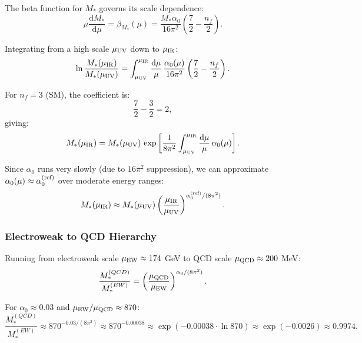 \documentclass[11pt,a4paper]{article}
\numberwithin{equation}{section}
\theoremstyle{plain}
\theoremstyle{definition}
\theoremstyle{remark}
\newcommand{\dd}{\mathrm{d}}
\begin{document}
The beta function for $M_*$ governs its scale dependence:
\begin{equation}
\mu\frac{\dd M_*}{\dd\mu} = \beta_{M_*}(\mu) = \frac{M_*\alpha_0}{16\pi^2}\left(\frac{7}{2} - \frac{n_f}{2}\right).
\label{eq:beta-M-hierarchy}
\end{equation}

Integrating from a high scale $\mu_{\rm UV}$ down to $\mu_{\rm IR}$:
\begin{equation}
\ln\frac{M_*(\mu_{\rm IR})}{M_*(\mu_{\rm UV})} = \int_{\mu_{\rm UV}}^{\mu_{\rm IR}} \frac{\dd\mu}{\mu}\,\frac{\alpha_0(\mu)}{16\pi^2}\left(\frac{7}{2} - \frac{n_f}{2}\right).
\label{eq:M-running-integral}
\end{equation}

For $n_f=3$ (SM), the coefficient is:
\begin{equation}
\frac{7}{2} - \frac{3}{2} = 2,
\label{eq:coeff-M}
\end{equation}
giving:
\begin{equation}
M_*(\mu_{\rm IR}) = M_*(\mu_{\rm UV})\,\exp\left[\frac{1}{8\pi^2}\int_{\mu_{\rm UV}}^{\mu_{\rm IR}} \frac{\dd\mu}{\mu}\,\alpha_0(\mu)\right].
\label{eq:M-running-solution}
\end{equation}

Since $\alpha_0$ runs very slowly (due to $16\pi^2$ suppression), we can approximate $\alpha_0(\mu)\approx\alpha_0^{(\rm ref)}$ over moderate energy ranges:
\begin{equation}
M_*(\mu_{\rm IR}) \approx M_*(\mu_{\rm UV})\left(\frac{\mu_{\rm IR}}{\mu_{\rm UV}}\right)^{\alpha_0^{(\rm ref)}/(8\pi^2)}.
\label{eq:M-power-law}
\end{equation}

\subsubsection{Electroweak to QCD Hierarchy}

Running from electroweak scale $\mu_{\rm EW}\approx 174$ GeV to QCD scale $\mu_{\rm QCD}\approx 200$ MeV:
\begin{equation}
\frac{M_*^{(QCD)}}{M_*^{(EW)}} = \left(\frac{\mu_{\rm QCD}}{\mu_{\rm EW}}\right)^{\alpha_0/(8\pi^2)}.
\label{eq:EW-QCD-ratio}
\end{equation}

For $\alpha_0\approx 0.03$ and $\mu_{\rm EW}/\mu_{\rm QCD}\approx 870$:
\begin{equation}
\frac{M_*^{(QCD)}}{M_*^{(EW)}} \approx 870^{-0.03/(8\pi^2)} \approx 870^{-0.00038} \approx \exp(-0.00038\cdot \ln 870) \approx \exp(-0.0026) \approx 0.9974.
\label{eq:ratio-RG-alone}
\end{equation}
\end{document}
